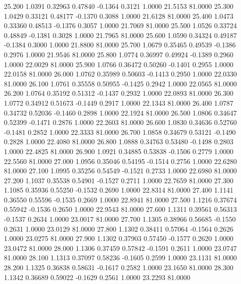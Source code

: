   25.200   1.0391   0.32963   0.47840  -0.1364   0.3121   1.0000  21.5153  81.0000
  25.300   1.0429   0.33121   0.48177  -0.1370   0.3088   1.0000  21.6128  81.0000
  25.400   1.0473   0.33360   0.48513  -0.1376   0.3057   1.0000  21.7069  81.0000
  25.500   1.0526   0.33724   0.48849  -0.1381   0.3028   1.0000  21.7965  81.0000
  25.600   1.0590   0.34324   0.49187  -0.1384   0.3000   1.0000  21.8800  81.0000
  25.700   1.0679   0.35465   0.49539  -0.1386   0.2976   1.0000  21.9546  81.0000
  25.800   1.0774   0.36997   0.49924  -0.1389   0.2960   1.0000  22.0029  81.0000
  25.900   1.0766   0.36472   0.50260  -0.1401   0.2955   1.0000  22.0158  81.0000
  26.000   1.0762   0.35989   0.50603  -0.1413   0.2950   1.0000  22.0330  81.0000
  26.100   1.0761   0.35558   0.50955  -0.1425   0.2942   1.0000  22.0565  81.0000
  26.200   1.0764   0.35192   0.51312  -0.1437   0.2932   1.0000  22.0893  81.0000
  26.300   1.0772   0.34912   0.51673  -0.1449   0.2917   1.0000  22.1343  81.0000
  26.400   1.0787   0.34732   0.52036  -0.1460   0.2898   1.0000  22.1924  81.0000
  26.500   1.0806   0.34647   0.52399  -0.1471   0.2876   1.0000  22.2603  81.0000
  26.600   1.0830   0.34636   0.52760  -0.1481   0.2852   1.0000  22.3333  81.0000
  26.700   1.0858   0.34679   0.53121  -0.1490   0.2828   1.0000  22.4080  81.0000
  26.800   1.0888   0.34763   0.53480  -0.1498   0.2803   1.0000  22.4825  81.0000
  26.900   1.0921   0.34885   0.53838  -0.1506   0.2779   1.0000  22.5560  81.0000
  27.000   1.0956   0.35046   0.54195  -0.1514   0.2756   1.0000  22.6280  81.0000
  27.100   1.0995   0.35256   0.54549  -0.1521   0.2733   1.0000  22.6980  81.0000
  27.200   1.1037   0.35538   0.54901  -0.1527   0.2711   1.0000  22.7659  81.0000
  27.300   1.1085   0.35936   0.55250  -0.1532   0.2690   1.0000  22.8314  81.0000
  27.400   1.1141   0.36550   0.55596  -0.1535   0.2669   1.0000  22.8941  81.0000
  27.500   1.1216   0.37674   0.55942  -0.1536   0.2650   1.0000  22.9543  81.0000
  27.600   1.1311   0.39561   0.56313  -0.1537   0.2634   1.0000  23.0017  81.0000
  27.700   1.1305   0.38966   0.56685  -0.1550   0.2631   1.0000  23.0129  81.0000
  27.800   1.1302   0.38411   0.57064  -0.1564   0.2626   1.0000  23.0275  81.0000
  27.900   1.1302   0.37903   0.57450  -0.1577   0.2620   1.0000  23.0472  81.0000
  28.000   1.1306   0.37459   0.57842  -0.1591   0.2611   1.0000  23.0747  81.0000
  28.100   1.1313   0.37097   0.58236  -0.1605   0.2599   1.0000  23.1131  81.0000
  28.200   1.1325   0.36838   0.58631  -0.1617   0.2582   1.0000  23.1650  81.0000
  28.300   1.1342   0.36689   0.59022  -0.1629   0.2561   1.0000  23.2293  81.0000

